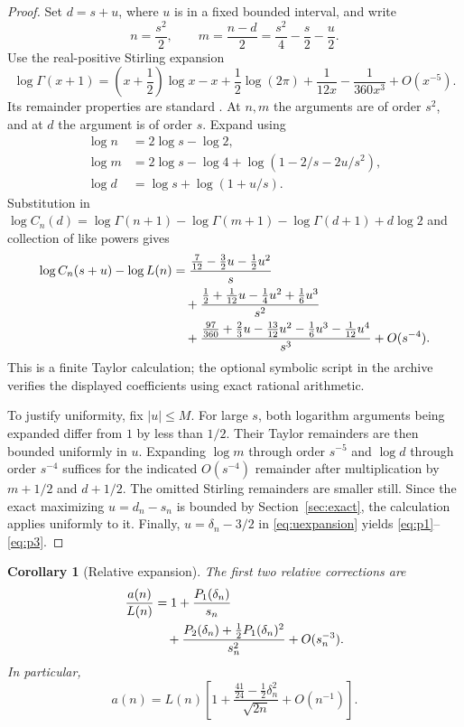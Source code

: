 \documentclass[11pt,letterpaper]{article}
\newtheorem{corollary}[theorem]{Corollary}
\theoremstyle{remark}
\begin{document}
\begin{proof}
Set $d=s+u$, where $u$ is in a fixed bounded interval, and write
\begin{equation}\label{eq:scales}
 n=\frac{s^2}{2},\qquad
 m=\frac{n-d}{2}=\frac{s^2}{4}-\frac s2-\frac u2.
\end{equation}
Use the real-positive Stirling expansion
\begin{equation}\label{eq:stirling}
 \log\Gamma(x+1)
 =\left(x+\frac12\right)\log x-x+\frac12\log(2\pi)
 +\frac{1}{12x}-\frac{1}{360x^3}+O(x^{-5}).
\end{equation}
Its remainder properties are standard \cite{dlmfgamma}. At $n,m$ the
arguments are of order $s^2$, and at $d$ the argument is of order $s$.
Expand using
\begin{align*}
 \log n&=2\log s-\log2,\\
 \log m&=2\log s-\log4+\log(1-2/s-2u/s^2),\\
 \log d&=\log s+\log(1+u/s).
\end{align*}
Substitution in
$\log C_n(d)=\log\Gamma(n+1)-\log\Gamma(m+1)-\log\Gamma(d+1)+d\log2$
and collection of like powers gives
\begin{align}
 \log C_n(s+u)-\log L(n)
 &=\frac{\tfrac7{12}-\tfrac32u-\tfrac12u^2}{s}\notag\\
 &\quad+\frac{\tfrac12+\tfrac1{12}u-\tfrac14u^2+\tfrac16u^3}{s^2}
 \notag\\
 &\quad+\frac{\tfrac{97}{360}+\tfrac23u-\tfrac{13}{12}u^2
                    -\tfrac16u^3-\tfrac1{12}u^4}{s^3}
 +O(s^{-4}).\label{eq:uexpansion}
\end{align}
This is a finite Taylor calculation; the optional symbolic script in the
archive verifies the displayed coefficients using exact rational arithmetic.

To justify uniformity, fix $|u|\le M$. For large $s$, both logarithm arguments
being expanded differ from $1$ by less than $1/2$. Their Taylor remainders
are then bounded uniformly in $u$. Expanding $\log m$ through order $s^{-5}$
and $\log d$ through order $s^{-4}$ suffices for the indicated $O(s^{-4})$
remainder after multiplication by $m+1/2$ and $d+1/2$. The omitted Stirling
remainders are smaller still. Since the exact maximizing $u=d_n-s_n$ is
bounded by Section~\ref{sec:exact}, the calculation applies uniformly to it.
Finally, $u=\delta_n-3/2$ in \eqref{eq:uexpansion} yields
\eqref{eq:p1}--\eqref{eq:p3}.
\end{proof}

\begin{corollary}[Relative expansion]\label{cor:relative}
The first two relative corrections are
\begin{align}
 \frac{a(n)}{L(n)}
 &=1+\frac{P_1(\delta_n)}{s_n}\notag\\
 &\quad+\frac{P_2(\delta_n)+\tfrac12P_1(\delta_n)^2}{s_n^2}
 +O(s_n^{-3}).\label{eq:relative}
\end{align}
In particular,
\begin{equation}\label{eq:firstrelative}
 \boxed{\displaystyle
 a(n)=L(n)\left[
 1+\frac{\tfrac{41}{24}-\tfrac12\delta_n^2}{\sqrt{2n}}
 +O(n^{-1})\right].}
\end{equation}
\end{corollary}
\end{document}
